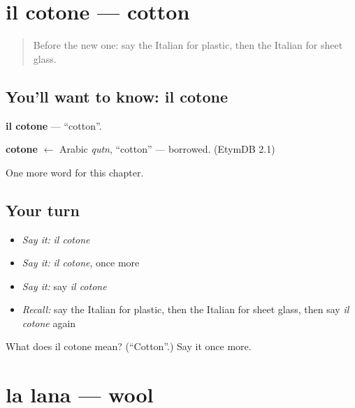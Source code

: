 \section[il cotone]{il cotone — cotton}

\label{lesson:IT-C230-cotone}



\begin{quote}
Before the new one: say the Italian for plastic, then the Italian for sheet glass.
\end{quote}

\subsection*{You'll want to know: il cotone}
\textbf{il cotone} — \textquotedblleft{}cotton\textquotedblright{}.

\begin{cousinweb}
\textbf{cotone} $\leftarrow$ Arabic \emph{qutn}, \textquotedblleft{}cotton\textquotedblright{} — borrowed. (EtymDB 2.1)
\end{cousinweb}

\begin{grammarlens}[title={What you've built}]
One more word for this chapter.
\end{grammarlens}

\subsection*{Your turn}
\begin{itemize}
\raggedright
  \item \emph{Say it:} \emph{il cotone}
  \item \emph{Say it:} \emph{il cotone}, once more
  \item \emph{Say it:} say \emph{il cotone}
  \item \emph{Recall:} say the Italian for plastic, then the Italian for sheet glass, then say \emph{il cotone} again
\end{itemize}

\begin{tcolorbox}[breakable,colback=teal!4,colframe=teal!35!black,title={Before you move on}]
What does il cotone mean? (\textquotedblleft{}Cotton\textquotedblright{}.) Say it once more.
\end{tcolorbox}
\section[la lana]{la lana — wool}

